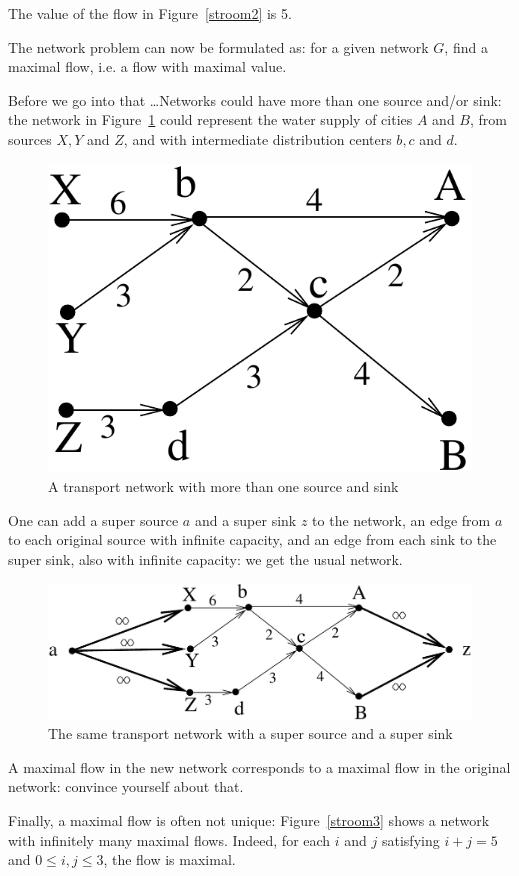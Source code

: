 The value of the flow in Figure~\ref{stroom2} is 5.



The network problem can now be formulated as: for a given network $G$,
find a maximal flow, i.e. a flow with maximal value.


Before we go into that \ldots Networks could have more than one source
and/or sink: the network in Figure~\ref{transport2} could represent
the water supply of cities $A$ and $B$, from sources $X,Y$ and $Z$,
and with intermediate distribution centers $b,c$ and $d$.

\begin{figure}[ht]
\begin{center}
\includegraphics[width=0.22\linewidth,keepaspectratio]{transport2} %
\end{center}
\caption{A transport network with more than one source and sink \label{transport2}}
\end{figure}

One can add a super source $a$ and a super sink $z$ to the network, an
edge from $a$ to each original source with infinite capacity, and an
edge from each sink to the super sink, also with infinite capacity: we
get the usual network.

\begin{figure}[ht]
\begin{center}
\includegraphics[width=0.507\linewidth,keepaspectratio]{transport3} %
\end{center}
\caption{The same transport network with a super source and a
super sink \label{transport3}}
\end{figure}

A maximal flow in the new network corresponds to a maximal flow in the
original network: convince yourself about that.

Finally, a maximal flow is often not unique: Figure~\ref{stroom3}
shows a network with infinitely many maximal flows. Indeed, for each
$i$ and $j$ satisfying $i+j = 5$ and $0 \leq i,j \leq 3$, the flow is
maximal.

